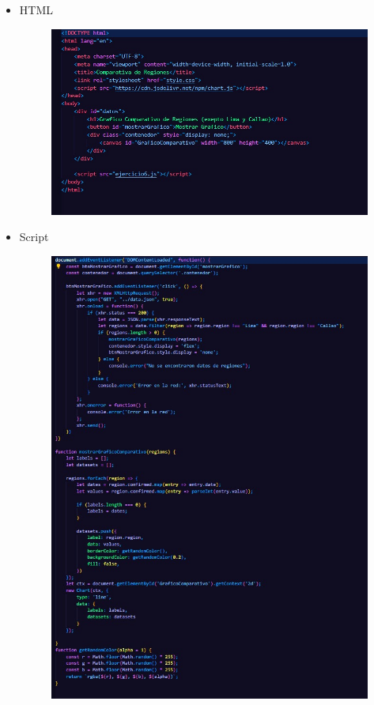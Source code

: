 \documentclass{article}
\begin{document}
	\begin{itemize}
		\item HTML
		\begin{figure}[H]
			\centering
			\includegraphics[width=1.0\textwidth,keepaspectratio]{img/Ejer6T2HTML.jpg}
		\end{figure}
		\item Script
		\begin{figure}[H]
			\centering
			\includegraphics[width=1.0\textwidth,keepaspectratio]{img/Ejer6T2Scipr.jpg}

\end{figure}
\end{itemize}
\end{document}
